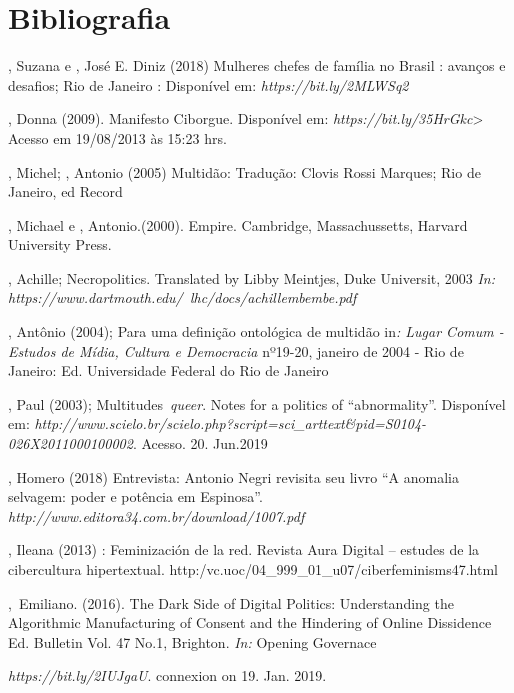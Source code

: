 \section{Bibliografia}

\begin{Parskip}
, Suzana e , José E. Diniz (2018) Mulheres chefes de
família no Brasil : avanços e desafios; Rio de Janeiro : Disponível em:
\emph{https://bit.ly/2MLWSq2}

, Donna (2009). Manifesto Ciborgue. Disponível em:
\emph{https://bit.ly/35HrGkc}\textgreater{}
Acesso em 19/08/2013 às 15:23 hrs.

, Michel; , Antonio (2005) Multidão: Tradução: Clovis Rossi
Marques; Rio de Janeiro, ed Record

, Michael e , Antonio.(2000). Empire. Cambridge,
Massachussetts, Harvard University Press.

, Achille; Necropolitics. Translated by Libby Meintjes, Duke
Universit, 2003 \emph{In:}
\emph{https://www.dartmouth.edu/~lhc/docs/achillembembe.pdf} %

, Antônio (2004); Para uma definição ontológica de multidão
in\emph{: Lugar Comum - Estudos de Mídia, Cultura e Democracia} nº19-20,
janeiro de 2004 - Rio de Janeiro: Ed. Universidade Federal do Rio de
Janeiro

, Paul (2003); Multitudes~\emph{queer}. Notes for a politics of
``abnormality''. Disponível em:
\emph{http://www.scielo.br/scielo.php?script=sci\_arttext\&pid=S0104-026X2011000100002}. %
Acesso. 20. Jun.2019

, Homero (2018) Entrevista: Antonio Negri revisita seu livro ``A
anomalia selvagem: poder e potência em Espinosa''.
\emph{http://www.editora34.com.br/download/1007.pdf}

, Ileana (2013) : Feminización de la red. Revista Aura
Digital -- estudes de la cibercultura hipertextual.
http:/vc.uoc/04\_999\_01\_u07/ciberfeminisms47.html

,~Emiliano. (2016). The Dark Side of Digital Politics:
Understanding the Algorithmic Manufacturing of Consent and the Hindering
of Online Dissidence Ed.  Bulletin Vol. 47 No.1, Brighton. \emph{In:}
Opening Governace

\emph{https://bit.ly/2IUJgaU}. connexion on 19. Jan. 2019.
\end{Parskip}

